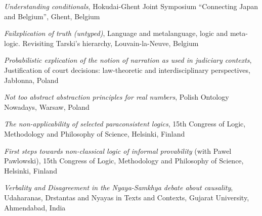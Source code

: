 \documentclass[10pt, a4paper]{article}
\newcommand{\years}[1]{\marginnote{\normalsize #1}}
\begin{document}
\vspace{0.5mm}


\years{2016} \emph{Understanding conditionals}, Hokudai-Ghent Joint Symposium “Connecting Japan and Belgium”,  Ghent, Belgium


\vspace{0.5mm}


\emph{Failxplication of truth (untyped)}, Language and metalanguage, logic and meta-logic. Revisiting Tarski's hierarchy,  Louvain-la-Neuve, Belgium


\vspace{0.5mm}

\emph{Probabilistic explication of the notion of narration as used in judiciary contexts}, Justification of court decisions: law-theoretic and interdisciplinary perspectives,  Jab{\l}onna, Poland


\vspace{0.5mm}


\emph{Not too abstract abstraction principles for real numbers}, Polish Ontology Nowadays,  Warsaw, Poland


\vspace{0.5mm}

 \years{2015} \emph{The non-applicability of selected paraconsistent logics}, 15th Congress of Logic, Methodology and Philosophy of Science,  Helsinki, Finland



\vspace{0.5mm}

 \emph{First steps towards non-classical logic of informal provability} (with Pawel Pawlowski), 15th Congress of Logic, Methodology and Philosophy of Science,  Helsinki, Finland





\vspace{0.5mm}


\years{2014} \emph{Verbality and Disagreement in the Nyaya-Samkhya debate about causality}, Udaharanas, Drstantas and Nyayas in Texts and Contexts,  Gujarat University, Ahmendabad, India



\vspace{0.5mm}
\end{document}
